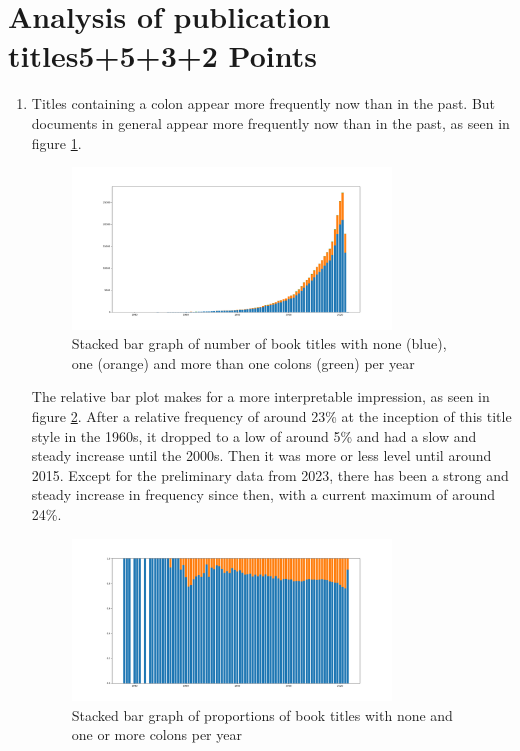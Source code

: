 \documentclass[10pt,a4paper]{article}
\begin{document}
\section{\hfill Analysis of publication titles\hfill 5+5+3+2 Points}
\begin{enumerate}
    \item Titles containing a colon appear more frequently now than in the past. But documents in general appear more frequently now than in the past, as seen in figure \ref{fig:1}.
    \begin{figure}[h]
        \centering
        \includegraphics[width=0.8\textwidth]{Figure_1.png}
        \caption{Stacked bar graph of number of book titles with none (blue), one (orange) and more than one colons (green) per year}
        \label{fig:1}
    \end{figure}
    
    The relative bar plot makes for a more interpretable impression, as seen in figure \ref{fig:2}. After a relative frequency of around 23\% at the inception of this title style in the 1960s, it dropped to a low of around 5\% and had a slow and steady increase until the 2000s. Then it was more or less level until around 2015. Except for the preliminary data from 2023, there has been a strong and steady increase in frequency since then, with a current maximum of around 24\%.
    \begin{figure}[h]
        \centering
        \includegraphics[width=0.8\textwidth]{Figure_2.png}
        \caption{Stacked bar graph of proportions of book titles with none and one or more colons per year}
        \label{fig:2}
    \end{figure}
    

\end{enumerate}
\end{document}

